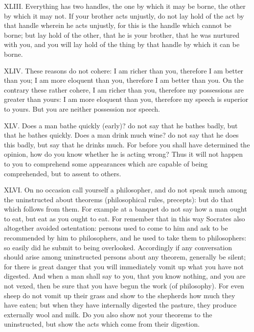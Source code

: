 XLIII. Everything has two handles, the one by which it may be borne, the other by which it may not. If your brother acts unjustly, do not lay hold of the act by that handle wherein he acts unjustly, for this is the handle which cannot be borne; but lay hold of the other, that he is your brother, that he was nurtured with you, and you will lay hold of the thing by that handle by which it can be borne.



XLIV. These reasons do not cohere: I am richer than you, therefore I am better than you; I am more eloquent than you, therefore I am better than you. On the contrary these rather cohere, I am richer than you, therefore my possessions are greater than yours: I am more eloquent than you, therefore my speech is superior to yours. But you are neither possession nor speech.



XLV. Does a man bathe quickly (early)? do not say that he bathes badly, but that he bathes quickly. Does a man drink much wine? do not say that he does this badly, but say that he drinks much. For before you shall have determined the opinion, how do you know whether he is acting wrong? Thus it will not happen to you to comprehend some appearances which are capable of being comprehended, but to assent to others.



XLVI. On no occasion call yourself a philosopher, and do not speak much among the uninstructed about theorems (philosophical rules, precepts): but do that which follows from them. For example at a banquet do not say how a man ought to eat, but eat as you ought to eat. For remember that in this way Socrates also altogether avoided ostentation: persons used to come to him and ask to be recommended by him to philosophers, and he used to take them to philosophers: so easily did he submit to being overlooked. Accordingly if any conversation should arise among uninstructed persons about any theorem, generally be silent; for there is great danger that you will immediately vomit up what you have not digested. And when a man shall say to you, that you know nothing, and you are not vexed, then be sure that you have begun the work (of philosophy). For even sheep do not vomit up their grass and show to the shepherds how much they have eaten; but when they have internally digested the pasture, they produce externally wool and milk. Do you also show not your theorems to the uninstructed, but show the acts which come from their digestion.



